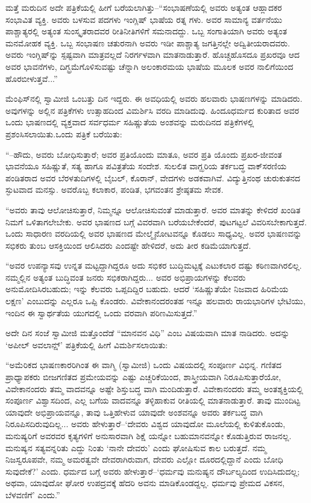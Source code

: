 ಮತ್ತೆ ಮರುದಿನ ಅದೇ ಪತ್ರಿಕೆಯಲ್ಲಿ ಹೀಗೆ ಬರೆಯಲಾಗಿತ್ತು–“ಸಂಭಾಷಣೆಯಲ್ಲಿ ಅವರು ಅತ್ಯಂತ ಆಹ್ಲಾದಕರ ಸಂಭಾವಿತ ವ್ಯಕ್ತಿ. ಅವರು ಬಳಸುವ ಪದಗಳು ಇಂಗ್ಲಿಷ್ ಭಾಷೆಯ ರತ್ನ ಗಳು. ಅವರ ಸಾಮಾನ್ಯ ವರ್ತನೆಯು ಪಾಶ್ಚಾತ್ಯರಲ್ಲಿ ಅತ್ಯಂತ ಸುಂಸ್ಕೃತರಾದವರ ರೀತಿನೀತಿಗಳಿಗೆ ಸಮನಾದದ್ದು. ಒಬ್ಬ ಸಂಗಾತಿಯಾಗಿ ಅವರು ಅತ್ಯಂತ ಮನಮೋಹಕ ವ್ಯಕ್ತಿ. ಒಬ್ಬ ಸಂಭಾಷಣ ಚತುರನಾಗಿ ಅವರು ಇಡೀ ಪಾಶ್ಚಾತ್ಯ ಜಗತ್ತಿನಲ್ಲೇ ಅದ್ವಿತೀಯರಾದವರು. ಅವರು ಇಂಗ್ಲಿಷ್​ನ್ನು ಸ್ಪಷ್ಟವಾಗಿ ಮಾತ್ರವಲ್ಲದೆ ನಿರರ್ಗಳವಾಗಿ ಮಾತನಾಡುತ್ತಾರೆ. ಹೊಚ್ಚಹೊಸದೂ ಪ್ರಖರವೂ ಆದ ಅವರ ಭಾವನೆಗಳು, ದಿಗ್ಭ್ರಮೆಗೊಳಿಸುವಷ್ಟು ಚೆನ್ನಾಗಿ ಅಲಂಕಾರಮಯ ಭಾಷೆಯ ಮೂಲಕ ಅವರ ನಾಲಿಗೆಯಿಂದ ಹೊರಬೀಳುತ್ತವೆ...”

ಮೆಂಫಿಸ್​ನಲ್ಲಿ ಸ್ವಾಮೀಜಿ ಒಂಬತ್ತು ದಿನ ಇದ್ದರು. ಈ ಅವಧಿಯಲ್ಲಿ ಅವರು ಹಲವಾರು ಭಾಷಣಗಳನ್ನು ಮಾಡಿದರು. ಅವುಗಳನ್ನು ಅಲ್ಲಿನ ಪತ್ರಿಕೆಗಳು ಉತ್ಸಾಹದಿಂದ ವಿಮರ್ಶಿಸಿ ವರದಿ ಮಾಡಿದುವು. ಹಿಂದೂಧರ್ಮದ ಕುರಿತಾದ ಅವರ ಒಂದು ಭಾಷಣದಲ್ಲಿ ವ್ಯಕ್ತವಾದ ಸರ್ವಧರ್ಮ ಸಹಿಷ್ಣುತೆಯ ಅಂಶವನ್ನು ಮರುದಿನದ ಪತ್ರಿಕೆಗಳಲ್ಲಿ ಪ್ರಶಂಸಿಸಲಾಯಿತು.ಒಂದು ಪತ್ರಿಕೆ ಬರೆಯಿತು:

“–ಹೌದು, ಅವರು ಬೋಧಿಸುತ್ತಾರೆ; ಅವರ ಪ್ರತಿಯೊಂದು ಮಾತೂ, ಅವರ ಪ್ರತಿ ಯೊಂದು ಪ್ರಖರ-ಜೀವಂತ ಭಾವನೆಯೂ ಸಹಿಷ್ಣುತೆ, ಸತ್ಯ ಹಾಗೂ ಪವಿತ್ರತೆಯ ಸಂದೇಶ. ಸುಲಲಿತ ವಾಗ್ಝರಿಯ ತರ್ಕಬದ್ಧ ವಾಕ್​ಸರಣಿಯ ಪಂಡಿತರಾದ ಅವರ ಬೆರಳತುದಿಗಳಲ್ಲಿ ಬೈಬಲ್, ಕೊರಾನ್, ವೇದಗಳು ಅಡಕವಾಗಿವೆ. ವಿದ್ಯುತ್ತಿನಂಥ ಚುರುಕುತನದ ಸ್ಫುಟವಾದ ಮನಸ್ಸು. ಅವರೊಬ್ಬ ಕಲಾಕಾರ, ಪಂಡಿತ, ಭಗವಂತನ ಶ್ರೇಷ್ಠತಮ ಸೇವಕ.

“ಅವರು ತಾವು ಆಲೋಚಿಸುತ್ತಾರೆ, ನಿಮ್ಮನ್ನೂ ಆಲೋಚಿಸುವಂತೆ ಮಾಡುತ್ತಾರೆ. ಅವರ ಮಾತನ್ನು ಕೇಳಿದರೆ ಖಂಡಿತ ನಿಮಗೆ ಒಳಿತಾಗಲೇಬೇಕು. ಅವರ ಭಾಷಣದ ಬಗ್ಗೆ ವಿವರವಾಗಿ ಬರೆಯಬೇಕೆಂದರೆ, ಪುಟಗಟ್ಟಲೆ ವಿವರಿಸಬೇಕಾಗುತ್ತದೆ. ಒಂದು ಸಾಧಾರಣ ವರದಿಯಲ್ಲಿ ಅವರ ಭಾಷಣದ ಮೇಲ್ಮೈನೋಟವನ್ನೂ ಕೊಡಲು ಸಾಧ್ಯವಿಲ್ಲ. ಅವರ ಭಾಷಣವನ್ನು ಸಭಿಕರು ತುಂಬ ಆಸಕ್ತಿಯಿಂದ ಆಲಿಸಿದರು ಎಂದಷ್ಟೇ ಹೇಳಿದರೆ, ಅದು ತೀರ ಕಡಿಮೆಯಾಗುತ್ತದೆ.

“ಅವರ ಉಪನ್ಯಾಸವು ಉನ್ನತ ಮಟ್ಟದ್ದಾಗಿದ್ದರೂ ಅದು ಸಭಿಕರ ಬುದ್ಧಿಮಟ್ಟಕ್ಕೆ ಎಟುಕಲಾರ ದಷ್ಟು ಕಠಿಣವಾಗಿರಲಿಲ್ಲ. ನಮ್ಮಲ್ಲಿನ ಅತ್ಯಂತ ಬುದ್ಧಿವಂತ ಜನರು ಸಭಿಕರಾಗಿದ್ದರು... ಅವರ ಅಭಿಪ್ರಾಯಗಳನ್ನು ಕೆಲವರು ಅನುಮೋದಿಸಿರಬಹುದು; ಇನ್ನು ಕೆಲವರು ಒಪ್ಪದಿದ್ದಿರ ಬಹುದು. ಆದರೆ ‘ಸಹಿಷ್ಣುತೆಯೇ ನಿಜವಾದ ಹಿರಿಮೆಯ ಲಕ್ಷಣ’ ಎಂಬುದನ್ನು ಎಲ್ಲರೂ ಒಪ್ಪಿ ಕೊಂಡರು. ವಿವೇಕಾನಂದರಂತಹ ಇನ್ನೂ ಹಲವಾರು ರಾಯಭಾರಿಗಳ ಭೇಟಿಯು, ಇಂದಿನ ಈ ಸ್ವಾರ್ಥತೆಯ ಯುಗದಲ್ಲಿ ಒಂದು ವರವಾಗಿ ಪರಿಣಮಿಸುತ್ತದೆ.”

ಅದೇ ದಿನ ಸಂಜೆ ಸ್ವಾಮೀಜಿ ಮತ್ತೊಂದೆಡೆ “ಮಾನವನ ವಿಧಿ” ಎಂಬ ವಿಷಯವಾಗಿ ಮಾತ ನಾಡಿದರು. ಅದನ್ನು ‘ಅಪೀಲ್ ಅವಲಾನ್ಷ್​’ ಪತ್ರಿಕೆಯಲ್ಲಿ ಹೀಗೆ ವಿಮರ್ಶಿಸಲಾಯಿತು:

“ಅಮೆರಿಕದ ಭಾಷಣಕಾರರಿಗಿಂತ ಈ ವಾಗ್ಮಿ (ಸ್ವಾಮೀಜಿ) ಒಂದು ವಿಷಯದಲ್ಲಿ ಸಂಪೂರ್ಣ ವಿಭಿನ್ನ. ಗಣಿತದ ಪ್ರಾಧ್ಯಾಪಕರು ಬೀಜಗಣಿತದ ಪ್ರಮೇಯವನ್ನು ಎಷ್ಟು ಎಚ್ಚರಿಕೆಯಿಂದ, ಶಾಸ್ತ್ರೀಯವಾಗಿ ನಿರೂಪಿಸುತ್ತಾರೆಯೋ, ವಿವೇಕಾನಂದರು ತಮ್ಮ ವಾದವನ್ನೂ ಅಷ್ಟೇ ಶಿಸ್ತುಬದ್ಧ ವಾಗಿ ಮಂದಿಡುತ್ತಾರೆ. ವಿವೇಕಾನಂದರು ತಮ್ಮ ಅಂತಶ್ಶಕ್ತಿಯಲ್ಲಿ ಸಂಪೂರ್ಣ ವಿಶ್ವಾಸದಿಂದ, ಎಲ್ಲ ಬಗೆಯ ವಾದವನ್ನೂ ತಳ್ಳಿಹಾಕುವ ರೀತಿಯಲ್ಲಿ ಮಾತನಾಡುತ್ತಾರೆ. ತಾವು ಮುಂದಿಟ್ಟ ಯಾವುದೇ ಅಭಿಪ್ರಾಯವನ್ನೂ, ತಾವು ಒತ್ತಿಹೇಳುವ ಯಾವುದೇ ಅಂಶವನ್ನೂ ಅವರು ತರ್ಕಬದ್ಧ ವಾಗಿ ನಿರೂಪಿಸದಿರುವುದಿಲ್ಲ... ಅವರು ಹೇಳುತ್ತಾರೆ–‘ದೇವರು ವಿಶ್ವದ ಯಾವುದೋ ಮೂಲೆಯಲ್ಲಿ ಕುಳಿತುಕೊಂಡು, ಮನುಷ್ಯರಿಗೆ ಅವರವರ ಕೃತ್ಯಗಳಿಗೆ ಅನುಸಾರವಾಗಿ ಶಿಕ್ಷೆ ಯನ್ನೋ ಬಹುಮಾನವನ್ನೋ ಕೊಡುತ್ತಿರುವ ರಾಜನಲ್ಲ. ಮನುಷ್ಯನ ಸತ್ಯವನ್ನರಿತು ಎದ್ದು ನಿಂತು ‘ನಾನೇ ದೇವರು’ ಎಂದು ಘೋಷಿಸುವ ಕಾಲ ಬರುತ್ತದೆ. ನಮ್ಮ ನಿಜಸ್ವರೂಪವೇ, ನಮ್ಮ ಅಮರತ್ವವೇ ದೇವರಾಗಿರುವಾಗ, ದೇವರು ಎಲ್ಲೋ ದೂರದಲ್ಲಿದ್ದಾನೆ ಎಂದು ಬೋಧಿ ಸುವುದೇಕೆ?’ ಎಂದು. ಧರ್ಮದ ಬಗ್ಗೆ ಅವರು ಹೇಳುತ್ತಾರೆ–‘ಧರ್ಮವು ಮನುಷ್ಯನ ದೌರ್ಬಲ್ಯದಿಂದ ಉದಿಸಿದುದಲ್ಲ; ಅಥವಾ, ಯಾವುದೋ ಘೋರ ಉಪದ್ರವಕ್ಕೆ ಹೆದರಿ ಅವನು ಮಾಡಿಕೊಂಡದ್ದಲ್ಲ. ಧರ್ಮವು ಪ್ರೇಮದ ವಿಕಸನ, ಬೆಳವಣಿಗೆ’ ಎಂದು.”


